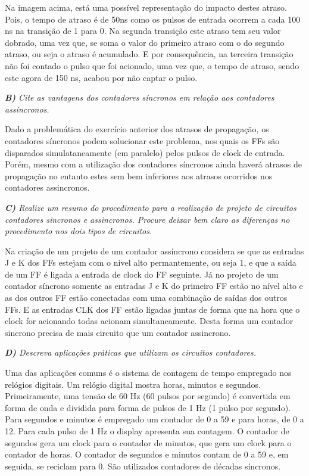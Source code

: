 \documentclass[12pts]{article}
\begin{document}
Na imagem acima, está uma possível representação do impacto destes atraso. Pois, o tempo de atraso é de 50ns como os pulsos de entrada ocorrem a cada 100 ns na transição de 1 para 0. Na segunda transição este atraso tem seu valor dobrado, uma vez que, se soma o valor do primeiro atraso com o do segundo atraso, ou seja o atraso é acumulado. E por consequência, na terceira transição não foi contado o pulso que foi acionado, uma vez que, o tempo de atraso, sendo este agora de 150 ns, acabou por não captar o pulso.  

\pagebreak
\textit{\textbf{B)} Cite as vantagens dos contadores síncronos em relação aos contadores assíncronos.}
\singlespacing

Dado a problemática do exercício anterior dos atrasos de propagação, os contadores síncronos podem solucionar este problema, nos quais os FFs são disparados simulataneamente (em paralelo) pelos pulsos de clock de entrada. Porém, mesmo com a utilização dos contadores síncronos ainda haverá atrasos de propagação no entanto estes sem bem inferiores aos atrasos ocorridos nos contadores assincronos. 

\singlespacing
\textit{\textbf{C)} Realize um resumo do procedimento para a realização de projeto de circuitos contadores sincronos e assincronos. Procure deixar bem claro as diferenças no procedimento nos dois tipos de circuitos.}
\singlespacing

Na criação de um projeto de um contador assíncrono considera se que as entradas J e K dos FFs estejam com o nivel alto permantemente, ou seja 1, e que a saída de um FF é ligada a entrada de clock do FF seguinte. Já no projeto de um contador síncrono somente as entradas J e K do primeiro FF estão no nível alto e as dos outros FF estão conectadas com uma combinação de saídas dos outros FFs. E as entradas CLK dos FF estão ligadas juntas de forma que na hora que o clock for acionando todas acionam simultaneamente. Desta forma um contador sincrono precisa de mais circuito que um contador assincrono.

\singlespacing
\textit{\textbf{D)} Descreva aplicações práticas que utilizam os circuitos contadores.}

\singlespacing
Uma das aplicações comuns é o sistema de contagem de tempo empregado nos relógios digitais. Um relógio digital mostra horas, minutos e segundos. Primeiramente, uma tensão de 60 Hz (60 pulsos por segundo) é convertida em forma de onda e dividida para forma de pulsos de 1 Hz (1 pulso por segundo). Para segundos e minutos é empregado um contador de 0 a 59 e para horas, de 0 a 12. Para cada pulso de 1 Hz o display apresenta sua contagem. O contador de segundos gera um clock para o contador de minutos, que gera um clock para o contador de horas. O contador de segundos e minutos contam de 0 a 59 e, em seguida, se reciclam para 0. São utilizados contadores de décadas síncronos.
\end{document}
